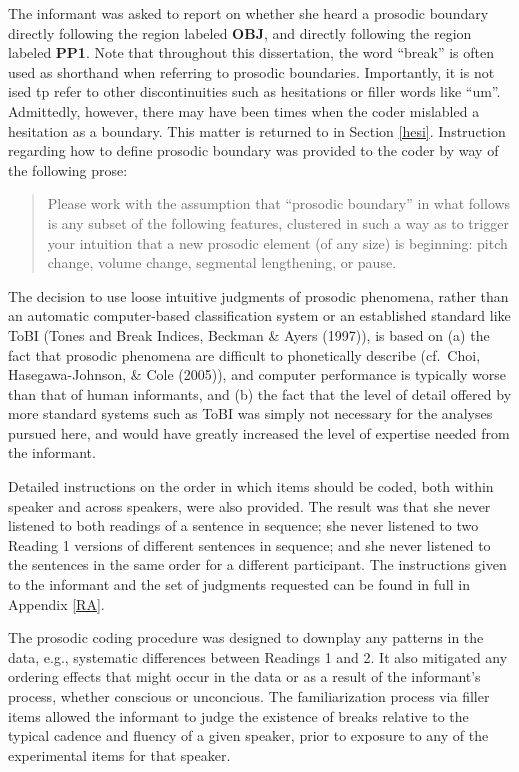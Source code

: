 \documentclass[11pt,oneside]{book}
\begin{document}
The informant was asked to report on whether she heard a prosodic boundary directly following the region labeled \textbf{OBJ}, and directly following the region labeled \textbf{PP1}. Note that throughout this dissertation, the word ``break'' is often used as shorthand when referring to prosodic boundaries. Importantly, it is not ised tp refer to other discontinuities such as hesitations or filler words like ``um''. Admittedly, however, there may have been times when the coder mislabled a hesitation as a boundary. This matter is returned to in Section \ref{hesi}. Instruction regarding how to define prosodic boundary was provided to the coder by way of the following prose:

\begin{quote}
Please work with the assumption that ``prosodic boundary'' in what follows is any subset of the following features, clustered in such a way as to trigger your intuition that a new prosodic element (of any size) is beginning: pitch change, volume change, segmental lengthening, or pause.
\end{quote}

The decision to use loose intuitive judgments of prosodic phenomena, rather than an automatic computer-based classification system or an established standard like ToBI (Tones and Break Indices, Beckman \& Ayers (1997)), is based on (a) the fact that prosodic phenomena are difficult to phonetically describe (cf.~Choi, Hasegawa-Johnson, \& Cole (2005)), and computer performance is typically worse than that of human informants, and (b) the fact that the level of detail offered by more standard systems such as ToBI was simply not necessary for the analyses pursued here, and would have greatly increased the level of expertise needed from the informant.

Detailed instructions on the order in which items should be coded, both within speaker and across speakers, were also provided. The result was that she never listened to both readings of a sentence in sequence; she never listened to two Reading 1 versions of different sentences in sequence; and she never listened to the sentences in the same order for a different participant. The instructions given to the informant and the set of judgments requested can be found in full in Appendix \ref{RA}.

The prosodic coding procedure was designed to downplay any patterns in the data, e.g., systematic differences between Readings 1 and 2. It also mitigated any ordering effects that might occur in the data or as a result of the informant's process, whether conscious or unconcious. The familiarization process via filler items allowed the informant to judge the existence of breaks relative to the typical cadence and fluency of a given speaker, prior to exposure to any of the experimental items for that speaker.
\end{document}
